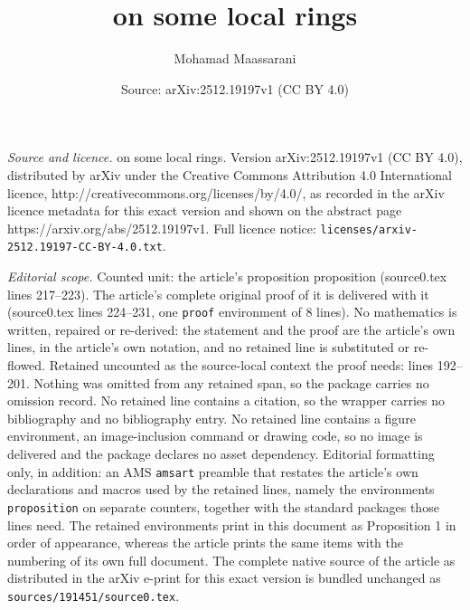 \documentclass[10pt,a4paper]{amsart}
\title{on some local rings}
\author{Mohamad Maassarani}
\date{Source: arXiv:2512.19197v1 (CC BY 4.0)}
\begin{document}
\maketitle

\noindent\emph{Source and licence.} on some local rings. Version arXiv:2512.19197v1 (CC BY 4.0), distributed by arXiv under the Creative Commons Attribution 4.0 International licence, http://creativecommons.org/licenses/by/4.0/, as recorded in the arXiv licence metadata for this exact version and shown on the abstract page https://arxiv.org/abs/2512.19197v1. Full licence notice: \texttt{licenses/arxiv-2512.19197-CC-BY-4.0.txt}.\par\smallskip

\noindent\textit{Editorial scope.} Counted unit: the article's proposition proposition (source0.tex lines 217--223). The article's complete original proof of it is delivered with it (source0.tex lines 224--231, one \texttt{proof} environment of 8 lines). No mathematics is written, repaired or re-derived: the statement and the proof are the article's own lines, in the article's own notation, and no retained line is substituted or re-flowed.  Retained uncounted as the source-local context the proof needs: lines 192--201.  Nothing was omitted from any retained span, so the package carries no omission record.  No retained line contains a citation, so the wrapper carries no bibliography and no bibliography entry.  No retained line contains a figure environment, an image-inclusion command or drawing code, so no image is delivered and the package declares no asset dependency.  Editorial formatting only, in addition: an AMS \texttt{amsart} preamble that restates the article's own declarations and macros used by the retained lines, namely the environments \texttt{proposition} on separate counters, together with the standard packages those lines need.  The retained environments print in this document as Proposition 1 in order of appearance, whereas the article prints the same items with the numbering of its own full document.  The complete native source of the article as distributed in the arXiv e-print for this exact version is bundled unchanged as \texttt{sources/191451/source0.tex}.
\end{document}
